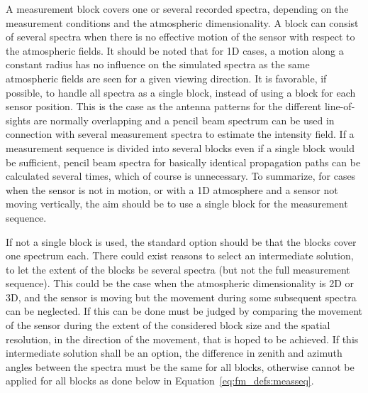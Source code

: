 A measurement block covers one or several recorded spectra, depending
on the measurement conditions and the atmospheric dimensionality. A
block can consist of several spectra when there is no effective
motion of the sensor with respect to the atmospheric fields. It should
be noted that for 1D cases, a motion along a constant radius has no
influence on the simulated spectra as the same atmospheric fields are
seen for a given viewing direction. It is favorable, if possible, to
handle all spectra as a single block, instead of using a block for
each sensor position. This is the case as the antenna patterns for the
different line-of-sights are normally overlapping and a pencil beam
spectrum can be used in connection with several measurement spectra to
estimate the intensity field. If a measurement sequence is divided
into several blocks even if a single block would be sufficient, pencil
beam spectra for basically identical propagation paths can be
calculated several times, which of course is unnecessary. To
summarize, for cases when the sensor is not in motion, or with a 1D
atmosphere and a sensor not moving vertically, the aim should be to
use a single block for the measurement sequence.

If not a single block is used, the standard option should be that the
blocks cover one spectrum each. There could exist reasons to select an
intermediate solution, to let the extent of the blocks be several
spectra (but not the full measurement sequence). This could be the
case when the atmospheric dimensionality is 2D or 3D, and the sensor
is moving but the movement during some subsequent spectra can be
neglected. If this can be done must be judged by comparing the
movement of the sensor during the extent of the considered block
size and the spatial resolution, in the direction of the movement, that
is hoped to be achieved. If this intermediate solution shall be an
option, the difference in zenith and azimuth angles between the
spectra must be the same for all blocks, otherwise  cannot
be applied for all blocks as done below in Equation~\ref{eq:fm_defs:measseq}.

